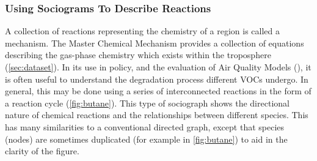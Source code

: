 
\subsubsection{Using Sociograms To Describe Reactions}\label{sec:mcmgraph}

A collection of reactions representing the chemistry of a region is called a mechanism. The Master Chemical Mechanism \citep{mcm} provides a collection of equations describing the gas-phase chemistry which exists within the troposphere (\autoref{sec:dataset}). In its use in policy, and the evaluation of Air Quality Models (\citep{defra1}), it is often useful to understand the degradation process different VOCs undergo. In general, this may be done using a series of interconnected reactions in the form of a reaction cycle (\autoref{fig:butane}). This type of sociograph shows the directional nature of chemical reactions and the relationships between different species. This has many similarities to a conventional directed graph, except that species (nodes) are sometimes duplicated (for example  in \autoref{fig:butane}) to aid in the clarity of the figure.

